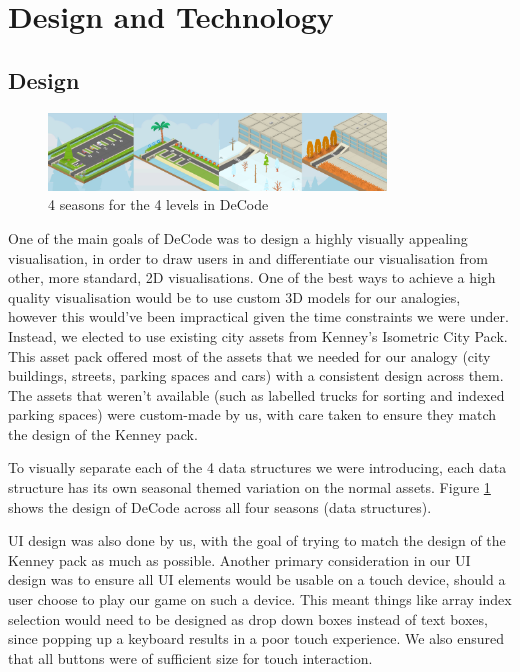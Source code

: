 \documentclass[11pt]{article}
\begin{document}
\section{Design and Technology}
\subsection{Design}
\begin{figure}
  \centering
  \includegraphics[width=0.8\textwidth]{images/seasons.png}
\caption{4 seasons for the 4 levels in DeCode}
\label{fig:seasons}
\end{figure}
One of the main goals of DeCode was to design a highly visually appealing visualisation, in order to draw users in and differentiate our visualisation from other, more standard, 2D visualisations. One of the best ways to achieve a high quality visualisation would be to use custom 3D models for our analogies, however this would've been impractical given the time constraints we were under. Instead, we elected to use existing city assets from Kenney's Isometric City Pack\cite{KenneyAssets}. This asset pack offered most of the assets that we needed for our analogy (city buildings, streets, parking spaces and cars) with a consistent design across them. The assets that weren't available (such as labelled trucks for sorting and indexed parking spaces) were custom-made by us, with care taken to ensure they match the design of the Kenney pack.\par
To visually separate each of the 4 data structures we were introducing, each data structure has its own seasonal themed variation on the normal assets. Figure \ref{fig:seasons} shows the design of DeCode across all four seasons (data structures).\par
UI design was also done by us, with the goal of trying to match the design of the Kenney pack as much as possible. Another primary consideration in our UI design was to ensure all UI elements would be usable on a touch device, should a user choose to play our game on such a device. This meant things like array index selection would need to be designed as drop down boxes instead of text boxes, since popping up a keyboard results in a poor touch experience. We also ensured that all buttons were of sufficient size for touch interaction.
\end{document}
